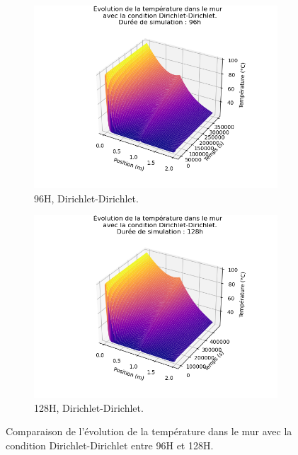 \documentclass[a4paper,11pt]{article}
\begin{document}
\begin{figure}[!ht]
    \centering
    \begin{subfigure}{0.45\textwidth}
        \centering
        \includegraphics[width=\textwidth]{img/Figure_DD_3D.png} %
        \caption{96H, Dirichlet-Dirichlet.}
        \label{fig:jalon2_dirichlet_dirichlet_96H}
    \end{subfigure}
    \hfill
    \begin{subfigure}{0.45\textwidth}
        \centering
        \includegraphics[width=\textwidth]{img/Figure_DD_3D_128.png} %
        \caption{128H, Dirichlet-Dirichlet.}
        \label{fig:jalon2_dirichlet_dirichlet_128H}
    \end{subfigure}
    \caption{Comparaison de l'évolution de la température dans le mur avec la condition Dirichlet-Dirichlet entre 96H et 128H.}
    \label{fig:jalon2_comparaison_dirichlet_dirichlet}
\end{figure}
\end{document}
